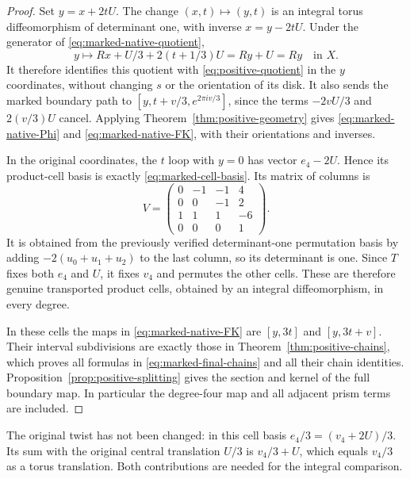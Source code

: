 \begin{proof}
Set $y=x+2tU$. The change $(x,t)\mapsto(y,t)$ is an integral
torus diffeomorphism of determinant one, with inverse
$x=y-2tU$. Under the generator of \eqref{eq:marked-native-quotient},
\[
 y\longmapsto Rx+U/3+2(t+1/3)U=Ry+U=Ry
                         \quad\text{in }X.
\]
It therefore identifies this quotient with
\eqref{eq:positive-quotient} in the $y$ coordinates, without
changing $s$ or the orientation of its disk. It also sends the
marked boundary path to
$[y,t+v/3,e^{2\pi iv/3}]$, since the terms $-2vU/3$ and
$2(v/3)U$ cancel. Applying Theorem~\ref{thm:positive-geometry}
gives \eqref{eq:marked-native-Phi} and
\eqref{eq:marked-native-FK}, with their orientations and inverses.

In the original coordinates, the $t$ loop with $y=0$ has vector
$e_4-2U$. Hence its product-cell basis is exactly
\eqref{eq:marked-cell-basis}. Its matrix of columns is
\begin{equation}\label{eq:marked-basis-matrix}
 V=\begin{pmatrix}
 0&-1&-1&4\\0&0&-1&2\\1&1&1&-6\\0&0&0&1
 \end{pmatrix}.
\end{equation}
It is obtained from the previously verified determinant-one
permutation basis by adding $-2(u_0+u_1+u_2)$ to the last
column, so its determinant is one. Since $T$ fixes both
$e_4$ and $U$, it fixes $v_4$ and permutes the other cells.
These are therefore genuine transported product cells, obtained
by an integral diffeomorphism, in every degree.

In these cells the maps in \eqref{eq:marked-native-FK} are
$[y,3t]$ and $[y,3t+v]$. Their interval subdivisions are exactly
those in Theorem~\ref{thm:positive-chains}, which proves all
formulas in \eqref{eq:marked-final-chains} and all their chain
identities. Proposition~\ref{prop:positive-splitting} gives the
section and kernel of the full boundary map. In particular the
degree-four map and all adjacent prism terms are included.
\end{proof}

The original twist has not been changed: in this cell basis
$e_4/3=(v_4+2U)/3$. Its sum with the original central translation
$U/3$ is $v_4/3+U$, which equals $v_4/3$ as a torus translation.
Both contributions are needed for the integral comparison.

